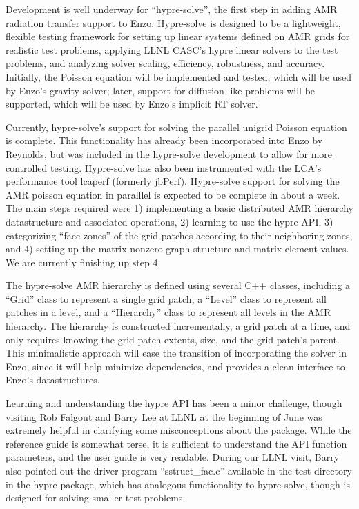 Development is well underway for ``hypre-solve'', the first step in
adding AMR radiation transfer support to Enzo.  Hypre-solve is
designed to be a lightweight, flexible testing framework for setting
up linear systems defined on AMR grids for realistic test problems,
applying LLNL CASC's hypre linear solvers to the test problems, and
analyzing solver scaling, efficiency, robustness, and accuracy.
Initially, the Poisson equation will be implemented and tested, which
will be used by Enzo's gravity solver; later, support for
diffusion-like problems will be supported, which will be used by
Enzo's implicit RT solver.

Currently, hypre-solve's support for solving the parallel unigrid
Poisson equation is complete.  This functionality has already been
incorporated into Enzo by Reynolds, but was included in the
hypre-solve development to allow for more controlled testing.
Hypre-solve has also been instrumented with the LCA's performance tool
lcaperf (formerly jbPerf).  Hypre-solve support for solving the AMR
poisson equation in paralllel is expected to be complete in about a
week.  The main steps required were 1) implementing a basic
distributed AMR hierarchy datastructure and associated operations, 2)
learning to use the hypre API, 3) categorizing ``face-zones'' of the
grid patches according to their neighboring zones, and 4) setting up
the matrix nonzero graph structure and matrix element values.  We are
currently finishing up step 4.

The hypre-solve AMR hierarchy is defined using several C++ classes,
including a ``Grid'' class to represent a single grid patch, a
``Level'' class to represent all patches in a level, and a
``Hierarchy'' class to represent all levels in the AMR hierarchy.  The
hierarchy is constructed incrementally, a grid patch at a time, and
only requires knowing the grid patch extents, size, and the grid
patch's parent.  This minimalistic approach will ease the transition
of incorporating the solver in Enzo, since it will help minimize
dependencies, and provides a clean interface to Enzo's datastructures.

Learning and understanding the hypre API has been a minor challenge,
though visiting Rob Falgout and Barry Lee at LLNL at the beginning of
June was extremely helpful in clarifying some misconceptions about the
package.  While the reference guide is somewhat terse, it is
sufficient to understand the API function parameters, and the user
guide is very readable.  During our LLNL visit, Barry also pointed out
the driver program ``sstruct_fac.c'' available in the test directory
in the hypre package, which has analogous functionality to
hypre-solve, though is designed for solving smaller test problems.

